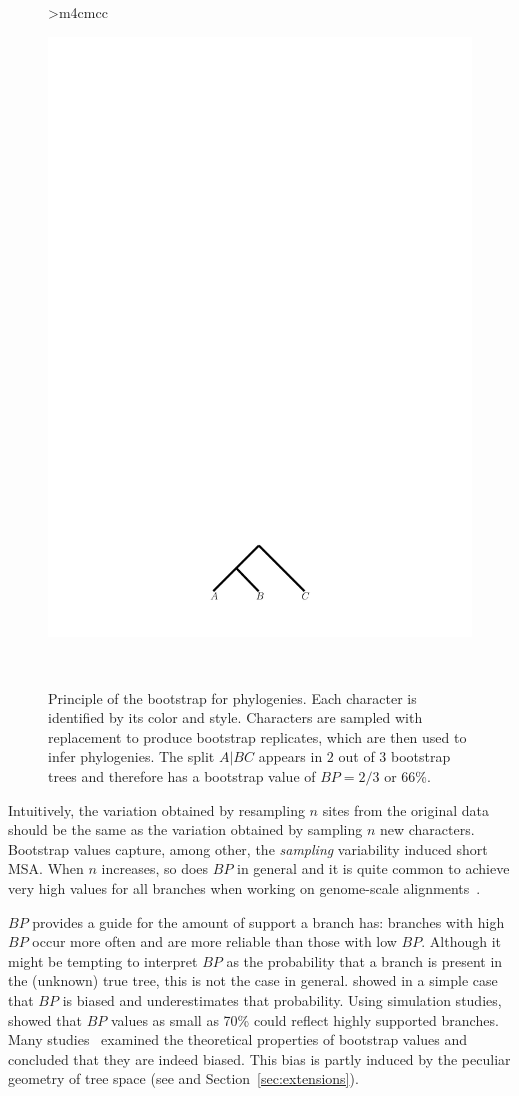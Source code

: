 \begin{figure}
\begin{center}
\begin{tabular}{>{\centering\arraybackslash}m{4cm}cc}
\begin{minipage}[c]{0.25\linewidth}
\begin{center}
              \includegraphics[width=0.6\linewidth]{Figs/TrueOne2.pdf}
            \end{center}
          \end{minipage}
          \\
	\end{tabular}
   \end{center}
   \caption{Principle of the bootstrap for phylogenies. Each character is identified by its color and style. Characters are sampled with replacement to produce bootstrap replicates, which are then used to infer phylogenies. The split $A|BC$ appears in $2$ out of $3$ bootstrap trees and therefore has a bootstrap value of $BP = 2/3$ or $66$\%.}
  \label{fig:bootstrap}
\end{figure}

Intuitively, the variation obtained by resampling $n$ sites from the original data should be the same as the variation obtained by sampling $n$ new characters. Bootstrap values capture, among other, the \emph{sampling} variability induced short MSA. When $n$ increases, so does $BP$ in general and it is quite common to achieve very high values for all branches when working on genome-scale alignments~\citep{Rokas2003}. 

$BP$ provides a guide for the amount of support a branch has: branches with high $BP$ occur more often and are more reliable than those with low $BP$. Although it might be tempting to interpret $BP$ as the probability that a branch is present in the (unknown) true tree, this is not the case in general. \cite{Zharkikh1992} showed in a simple case that $BP$ is biased and underestimates that probability. Using simulation studies, \cite{Hillis1993} showed that $BP$ values as small as 70\% could reflect highly supported branches. Many studies~\citep{Felsenstein1993, Efron1996, Susko2008, Susko2010} examined the theoretical properties of bootstrap values and concluded that they are indeed biased. This bias is partly induced by the peculiar geometry of tree space (see \cite{Billera2001, Susko2010} and Section~\ref{sec:extensions}). 

